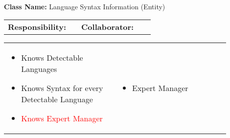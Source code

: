 \begin{cards}[]
    \textbf{Class Name:} Language Syntax Information (Entity)
    \tcbline
    \begin{tabular}{p{0.45\linewidth} | p{0.45\linewidth}}
        \textbf{Responsibility:}& 
        \textbf{Collaborator:}\\
    \end{tabular}
    \tcbline
    \begin{tabular}{p{0.45\linewidth} | p{0.45\linewidth}}
        \begin{itemize}
            \item Knows Detectable Languages
            \item Knows Syntax for every Detectable Language
            \item \textcolor{red}{Knows Expert Manager}
        \end{itemize}
        &
        \begin{itemize}
            \item Expert Manager
        \end{itemize}
    \end{tabular}
\end{cards}